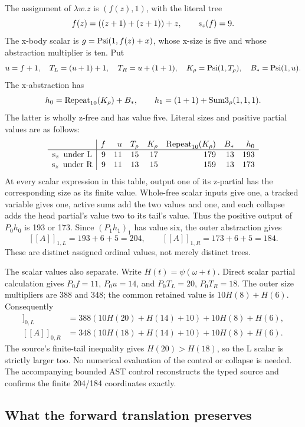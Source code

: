 The assignment of $\lambda w.z$ is $(f(z),1)$, with the literal tree
\[
 f(z)=((z+1)+(z+1))+z,\qquad\operatorname{s}_z(f)=9.
\]
The x-body scalar is $g=\operatorname{Psi}(1,f(z)+x)$, whose x-size is five and
whose abstraction multiplier is ten. Put
\[
 u=f+1,\quad T_L=(u+1)+1,\quad T_R=u+(1+1),\quad
 K_\rho=\operatorname{Psi}(1,T_\rho),\quad B_*=\operatorname{Psi}(1,u).
\]
The x-abstraction has
\[
 h_0=\operatorname{Repeat}_{10}(K_\rho)+B_*,\qquad
 h_1=(1+1)+\operatorname{Sum3}_\rho(1,1,1).
\]
The latter is wholly z-free and has value five. Literal sizes and
positive partial values are as follows:
\[
\begin{array}{c|rrrrrrr}
 &f&u&T_\rho&K_\rho&\operatorname{Repeat}_{10}(K_\rho)&B_*&h_0\\\hline
 \operatorname{s}_z\text{ under L}&9&11&15&17&179&13&193\\
 \operatorname{s}_z\text{ under R}&9&11&13&15&159&13&173
\end{array}
\]
At every scalar expression in this table, output one of its z-partial
has the corresponding size as its finite value. Whole-free scalar
inputs give one, a tracked variable gives one, active sums add the
two values and one, and each collapse adds the head partial's value
two to its tail's value. Thus the positive output of $P_0h_0$ is
193 or 173. Since $(P_1h_1)_1$ has value six, the outer abstraction gives
\[
 \boxed{\ [\![A]\!]_{1,L}=193+6+5=204,
 \qquad [\![A]\!]_{1,R}=173+6+5=184.\ }
\]
These are distinct assigned ordinal values, not merely distinct trees.

The scalar values also separate. Write $H(t)=\psi(\omega+t)$. Direct
scalar partial calculation gives $P_0f=11$, $P_0u=14$, and
$P_0T_L=20$, $P_0T_R=18$. The outer size multipliers are 388 and 348;
the common retained value is $10H(8)+H(6)$. Consequently
\begin{align*}
 [\![A]\!]_{0,L}&=388(10H(20)+H(14)+10)+10H(8)+H(6),\\
 [\![A]\!]_{0,R}&=348(10H(18)+H(14)+10)+10H(8)+H(6).
\end{align*}
The source's finite-tail inequality gives $H(20)>H(18)$, so the L
scalar is strictly larger too. No numerical evaluation of the control
or collapse is needed. The accompanying bounded AST control reconstructs
the typed source and confirms the finite 204/184 coordinates exactly.

\subsection{What the forward translation preserves}

